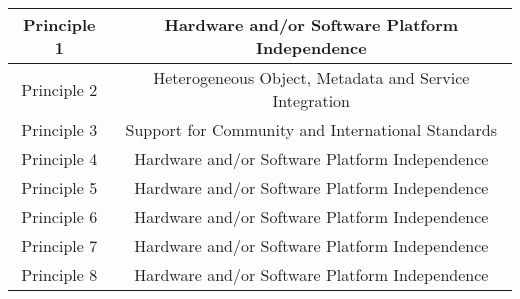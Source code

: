 \begin{tabular}{c c}
\hline
{Principle 1} & {Hardware and/or Software Platform Independence}\\
\hline
{Principle 2} & {Heterogeneous Object, Metadata and Service Integration}\\
\hline
{Principle 3} & {Support for Community and International Standards}\\
\hline
{Principle 4} & {Hardware and/or Software Platform Independence}\\
\hline
{Principle 5} & {Hardware and/or Software Platform Independence}\\
\hline
{Principle 6} & {Hardware and/or Software Platform Independence}\\
\hline
{Principle 7} & {Hardware and/or Software Platform Independence}\\
\hline
{Principle 8} & {Hardware and/or Software Platform Independence}\\
\hline
\end{tabular}
